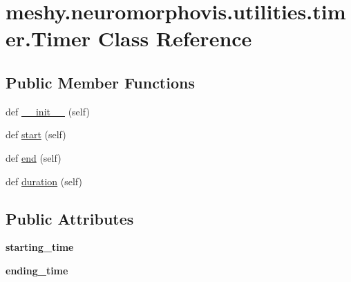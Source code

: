 \hypertarget{classmeshy_1_1neuromorphovis_1_1utilities_1_1timer_1_1Timer}{}\section{meshy.\+neuromorphovis.\+utilities.\+timer.\+Timer Class Reference}
\label{classmeshy_1_1neuromorphovis_1_1utilities_1_1timer_1_1Timer}


 


\subsection*{Public Member Functions}
\begin{DoxyCompactItemize}
\item 
def \hyperlink{classmeshy_1_1neuromorphovis_1_1utilities_1_1timer_1_1Timer_adca431e7f08098c25ef14f07505f9b9d}{\+\_\+\+\_\+init\+\_\+\+\_\+} (self)
\item 
def \hyperlink{classmeshy_1_1neuromorphovis_1_1utilities_1_1timer_1_1Timer_ae031c1870d9ae05aa01a21febe5c053e}{start} (self)
\item 
def \hyperlink{classmeshy_1_1neuromorphovis_1_1utilities_1_1timer_1_1Timer_a136fe8b0340bffb98ed9bfd518fb12da}{end} (self)
\item 
def \hyperlink{classmeshy_1_1neuromorphovis_1_1utilities_1_1timer_1_1Timer_a05d817b261b2757ad8c054c965af98fe}{duration} (self)
\end{DoxyCompactItemize}
\subsection*{Public Attributes}
\begin{DoxyCompactItemize}
\item 
{\bfseries starting\+\_\+time}\hypertarget{classmeshy_1_1neuromorphovis_1_1utilities_1_1timer_1_1Timer_a94685ba90c5725ddffdd3d40f9790086}{}\label{classmeshy_1_1neuromorphovis_1_1utilities_1_1timer_1_1Timer_a94685ba90c5725ddffdd3d40f9790086}

\item 
{\bfseries ending\+\_\+time}\hypertarget{classmeshy_1_1neuromorphovis_1_1utilities_1_1timer_1_1Timer_a7be6bf60fa0895e1a55f883d6b2738fe}{}\label{classmeshy_1_1neuromorphovis_1_1utilities_1_1timer_1_1Timer_a7be6bf60fa0895e1a55f883d6b2738fe}

\end{DoxyCompactItemize}


